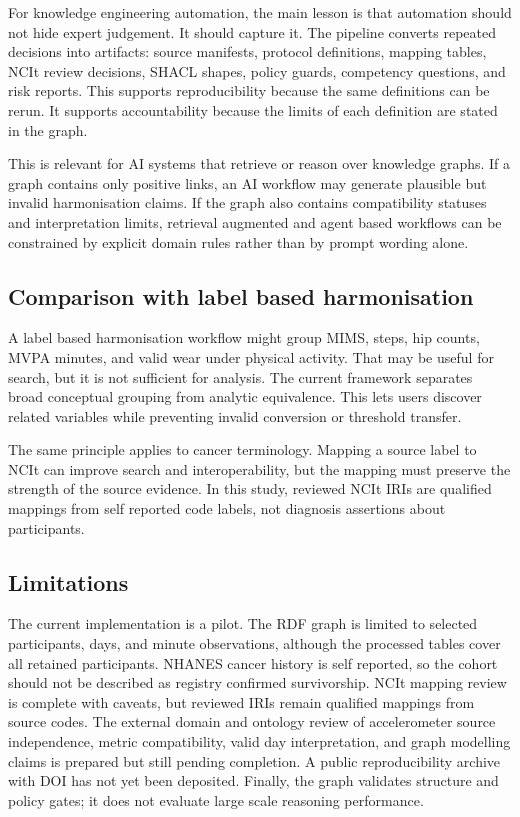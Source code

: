 \documentclass[final,5p,times,twocolumn]{elsarticle}
\begin{document}
For knowledge engineering automation, the main lesson is that automation should not hide expert judgement. It should capture it. The pipeline converts repeated decisions into artifacts: source manifests, protocol definitions, mapping tables, NCIt review decisions, SHACL shapes, policy guards, competency questions, and risk reports. This supports reproducibility because the same definitions can be rerun. It supports accountability because the limits of each definition are stated in the graph.

This is relevant for AI systems that retrieve or reason over knowledge graphs. If a graph contains only positive links, an AI workflow may generate plausible but invalid harmonisation claims. If the graph also contains compatibility statuses and interpretation limits, retrieval augmented and agent based workflows can be constrained by explicit domain rules rather than by prompt wording alone.

\subsection{Comparison with label based harmonisation}

A label based harmonisation workflow might group MIMS, steps, hip counts, MVPA minutes, and valid wear under physical activity. That may be useful for search, but it is not sufficient for analysis. The current framework separates broad conceptual grouping from analytic equivalence. This lets users discover related variables while preventing invalid conversion or threshold transfer.

The same principle applies to cancer terminology. Mapping a source label to NCIt can improve search and interoperability, but the mapping must preserve the strength of the source evidence. In this study, reviewed NCIt IRIs are qualified mappings from self reported code labels, not diagnosis assertions about participants.

\subsection{Limitations}

The current implementation is a pilot. The RDF graph is limited to selected participants, days, and minute observations, although the processed tables cover all retained participants. NHANES cancer history is self reported, so the cohort should not be described as registry confirmed survivorship. NCIt mapping review is complete with caveats, but reviewed IRIs remain qualified mappings from source codes. The external domain and ontology review of accelerometer source independence, metric compatibility, valid day interpretation, and graph modelling claims is prepared but still pending completion. A public reproducibility archive with DOI has not yet been deposited. Finally, the graph validates structure and policy gates; it does not evaluate large scale reasoning performance.
\end{document}
